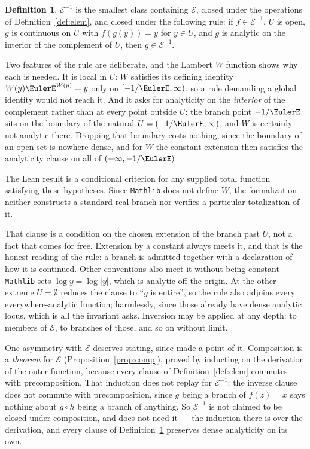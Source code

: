 \documentclass[11pt,oneside]{article}
\theoremstyle{definition}
\newtheorem{definition}[theorem]{Definition}
\theoremstyle{remark}
\newcommand{\Elem}{\mathcal E}
\begin{document}
\begin{definition}\label{def:elemplus}
$\Elem^{-1}$ is the smallest class containing $\Elem$, closed under the
operations of Definition~\ref{def:elem}, and closed under the following rule: if
$f\in\Elem^{-1}$, $U$ is open, $g$ is continuous on $U$ with $f(g(y))=y$ for
$y\in U$, and $g$ is analytic on the interior of the complement of $U$, then
$g\in\Elem^{-1}$.
\end{definition}

Two features of the rule are deliberate, and the Lambert $W$ function shows
why each is needed.  It is local in $U$: $W$ satisfies its defining identity
$W(y)\EulerE^{W(y)}=y$ only on $[-1/\EulerE,\infty)$, so a rule demanding a global
identity would not reach it.  And it asks for analyticity on the
\emph{interior} of the complement rather than at every point outside $U$: the
branch point $-1/\EulerE$ sits on the boundary of the natural $U=(-1/\EulerE,\infty)$,
and $W$ is certainly not analytic there.  Dropping that boundary costs
nothing, since the boundary of an open set is nowhere dense, and for $W$ the
constant extension then satisfies the analyticity clause on all of
$(-\infty,-1/\EulerE)$.

The Lean result is a conditional criterion for any supplied total function
satisfying these hypotheses.  Since \texttt{Mathlib} does not define $W$, the
formalization neither constructs a standard real branch nor verifies a
particular totalization of it.

That clause is a condition on the chosen extension of the branch past $U$, not
a fact that comes for free.  Extension by a constant always meets it, and that
is the honest reading of the rule: a branch is admitted together with a
declaration of how it is continued.  Other conventions also meet it without
being constant --- \texttt{Mathlib} sets $\log y=\log|y|$, which is analytic
off the origin.  At the other extreme $U=\emptyset$ reduces the clause to
``$g$ is entire'', so the rule also adjoins every everywhere-analytic
function; harmlessly, since those already have dense analytic locus, which is
all the invariant asks.  Inversion may be applied at any depth: to members of
$\Elem$, to branches of those, and so on without limit.

One asymmetry with $\Elem$ deserves stating, since  made a
point of it.  Composition is a \emph{theorem} for $\Elem$
(Proposition~\ref{prop:comp}), proved by inducting on the derivation of the
outer function, because every clause of Definition~\ref{def:elem} commutes with
precomposition.  That induction does not replay for $\Elem^{-1}$: the inverse
clause does not commute with precomposition, since $g$ being a branch of
$f(z)=x$ says nothing about $g\circ h$ being a branch of anything.  So
$\Elem^{-1}$ is not claimed to be closed under composition, and
 does not need it --- the induction there is over the
derivation, and every clause of Definition~\ref{def:elemplus} preserves dense
analyticity on its own.
\end{document}
